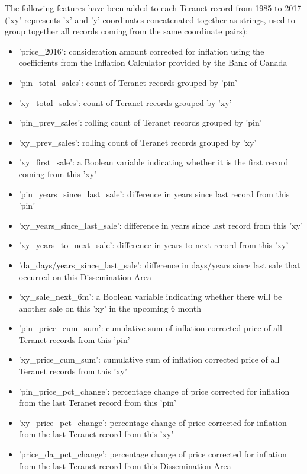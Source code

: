 The following features have been added to each Teranet record from 1985 to 2017 ('xy' represents 'x' and 'y' coordinates concatenated together as strings, used to group together all records coming from the same coordinate pairs):

\begin{itemize}
    \item 'price\_2016': consideration amount corrected for inflation using the coefficients from the Inflation Calculator provided by the Bank of Canada\cite{BankofCanada2019}
    \item 'pin\_total\_sales': count of Teranet records grouped by 'pin'
    \item 'xy\_total\_sales': count of Teranet records grouped by 'xy'
    \item 'pin\_prev\_sales': rolling count of Teranet records grouped by 'pin'
    \item 'xy\_prev\_sales': rolling count of Teranet records grouped by 'xy'
    \item 'xy\_first\_sale': a Boolean variable indicating whether it is the first record coming from this 'xy'
    \item 'pin\_years\_since\_last\_sale': difference in years since last record from this 'pin'
    \item 'xy\_years\_since\_last\_sale': difference in years since last record from this 'xy'
    \item 'xy\_years\_to\_next\_sale': difference in years to next record from this 'xy'
    \item 'da\_days/years\_since\_last\_sale': difference in days/years since last sale that occurred on this Dissemination Area
    \item 'xy\_sale\_next\_6m': a Boolean variable indicating whether there will be another sale on this 'xy' in the upcoming 6 month
    \item 'pin\_price\_cum\_sum': cumulative sum of inflation corrected price of all Teranet records from this 'pin'
    \item 'xy\_price\_cum\_sum': cumulative sum of inflation corrected price of all Teranet records from this 'xy'
    \item 'pin\_price\_pct\_change': percentage change of price corrected for inflation from the last Teranet record from this 'pin'
    \item 'xy\_price\_pct\_change': percentage change of price corrected for inflation from the last Teranet record from this 'xy'
    \item 'price\_da\_pct\_change': percentage change of price corrected for inflation from the last Teranet record from this Dissemination Area

\end{itemize}
